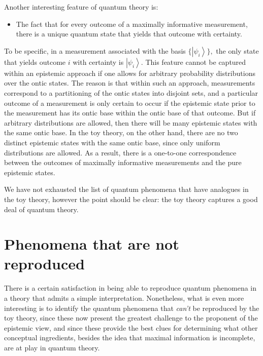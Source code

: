 \documentclass[pra,twocolumn,nofootinbib,showpacs]{revtex4}
\begin{document}
Another interesting feature of quantum theory is:

\begin{itemize}
\item The fact that for every outcome of a maximally informative
measurement, there is a unique quantum state that yields that outcome with
certainty.
\end{itemize}

To be specific, in a measurement associated with the basis $\{\left| \psi
_{i}\right\rangle \},$ the only state that yields outcome $i$ with certainty
is $\left| \psi _{i}\right\rangle .$ This feature cannot be captured within
an epistemic approach if one allows for arbitrary probability distributions
over the ontic states. The reason is that within such an approach,
measurements correspond to a partitioning of the ontic states into disjoint
sets, and a particular outcome of a measurement is only certain to occur if
the epistemic state prior to the measurement has its ontic base within the
ontic base of that outcome. But if arbitrary distributions are allowed, then
there will be many epistemic states with the same ontic base. In the toy
theory, on the other hand, there are no two distinct epistemic states with
the same ontic base, since only uniform distributions are allowed. As a
result, there is a one-to-one correspondence between the outcomes of
maximally informative measurements and the pure epistemic states.

We have not exhausted the list of quantum phenomena that have analogues in
the toy theory, however the point should be clear: the toy theory captures a
good deal of quantum theory.

\section{Phenomena that are not reproduced}

\label{phenomenathatdonotarise}

There is a certain satisfaction in being able to reproduce quantum phenomena
in a theory that admits a simple interpretation. Nonetheless, what is even
more interesting is to identify the quantum phenomena that \emph{can't }be
reproduced by the toy theory, since these now present the greatest challenge
to the proponent of the epistemic view, and since these provide the best
clues for determining what other conceptual ingredients, besides the idea
that maximal information is incomplete, are at play in quantum theory.
\end{document}
